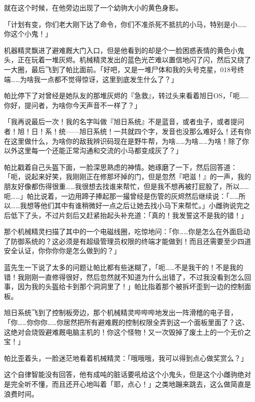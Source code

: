 就在这个时候，在他旁边出现了一个幼驹大小的黄色身影。

\horizonline


「计划有变，你们老大刚下达了命令，你们不准杀死不抵抗的小马，特别是小……你这个小鬼！」

机器精灵飘进了避难厩大门入口，但是他看到的却是个一脸困惑表情的黄色小鬼头，正在玩着一堆灰烬。机械精灵发出的蓝色光芒难以置信地闪了闪，然后又绕了一大圈，最后飞到了帕比面前。「好吧，又是一堆尸体和我的头号克星，018号终端……为啥我一点都不觉得惊讶，这里到底发生什么了？」

帕比停下了对曾经是她队友的那堆灰烬的『急救』，转过头来看着旭日OS，「呃……你好，提问者，为啥你今天声音不一样了？」

「我再说最后一次！我的名字叫做『旭日系统』不是蓝音，或者虫子，或者提问者！旭！日！系！统——旭日系统！一共就四个字，发音也没那么难好么！还有你在这里做什么，为啥你的敌我辨识码现在是野牛帮，为啥……为啥……为啥！除了你以外这里每一个还能正常沟通和交流的小马都变成灰了？」

帕比戳着自己头盔下面，一脸深思熟虑的神情。她琢磨了一下，然后回答道：「呃，说起来好笑，我刚刚正在修那坏掉的门，但是忽然『吧滋！』的一声，我的朋友好像都伤得很重……我很想去找谁来帮忙，但是我不想再被打屁股了，所以……呃……」帕比说着，一边用蹄子捧起那一撮曾经是伤管的灰烬然后继续说：「……所以……我想等他们其中有谁稍微好一点之后让她去找小马下来帮忙。」小雌驹说完之后低下了头，不过片刻后又赶紧抬起头补充道：「真的！我发誓这不是我的错！」

那个机械精灵扫描了其中的一个电磁线圈，吃惊地问：「你……你是怎么在外面启动了防御系统的？这必须是有超级管理员权限的终端才能做到！而且还需要至少四道安全认证，你你你你是怎么做到的？」

蓝先生一下说了太多的问题让帕比都有些迷糊了，「呃……不是我干的！不是我的错！我刚刚一直修得很好，然后忽然就不知道为什么出错了，不过我没看到怎么回事，因为我的头盔给卡到那个洞洞里了！」帕比指着那个被拆坏歪到一边的控制面板。

旭日系统飞到了控制板旁边，那个机械精灵哔哔哔地发出一阵滑稽的电子音，「你……你你你……你居然把所有避难厩的控制权限全弄到这一个面板里面了？这、这绝对会烧毁避难厩电脑主机的！你这个怪物！又一次毁掉了废土上的一个无价之宝！」

帕比歪着头，一脸迷茫地看着机械精灵：「哦哦哦，我可以得到点心做奖赏么？」

这个自律智能没有回答，他有成吨的脏话要吼给这个小鬼头，但是这个小雌驹绝对是完全听不懂，而且还开心地叫着「耶，点心！」之类地蹦来跳去，这么做简直是浪费时间。

